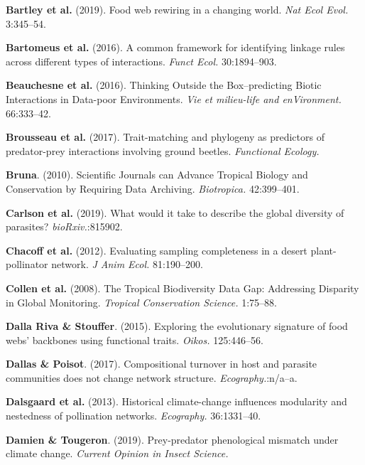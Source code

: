 \leavevmode\hypertarget{ref-BartMcCa19}{}%
\textbf{Bartley et al.} (2019). Food web rewiring in a changing world.
\emph{Nat Ecol Evol.} 3:345--54.

\leavevmode\hypertarget{ref-BartGrav16}{}%
\textbf{Bartomeus et al.} (2016). A common framework for identifying
linkage rules across different types of interactions. \emph{Funct Ecol.}
30:1894--903.

\leavevmode\hypertarget{ref-BeauDesj16}{}%
\textbf{Beauchesne et al.} (2016). Thinking Outside the Box--predicting
Biotic Interactions in Data-poor Environments. \emph{Vie et milieu-life
and enVironment.} 66:333--42.

\leavevmode\hypertarget{ref-BrouGrav17}{}%
\textbf{Brousseau et al.} (2017). Trait-matching and phylogeny as
predictors of predator-prey interactions involving ground beetles.
\emph{Functional Ecology.}

\leavevmode\hypertarget{ref-Brun10}{}%
\textbf{Bruna}. (2010). Scientific Journals can Advance Tropical Biology
and Conservation by Requiring Data Archiving. \emph{Biotropica.}
42:399--401.

\leavevmode\hypertarget{ref-CarlPhil19}{}%
\textbf{Carlson et al.} (2019). What would it take to describe the
global diversity of parasites? \emph{bioRxiv.}:815902.

\leavevmode\hypertarget{ref-ChacVazq12}{}%
\textbf{Chacoff et al.} (2012). Evaluating sampling completeness in a
desert plant-pollinator network. \emph{J Anim Ecol.} 81:190--200.

\leavevmode\hypertarget{ref-CollRam08}{}%
\textbf{Collen et al.} (2008). The Tropical Biodiversity Data Gap:
Addressing Disparity in Global Monitoring. \emph{Tropical Conservation
Science.} 1:75--88.

\leavevmode\hypertarget{ref-DallStou15}{}%
\textbf{Dalla Riva \& Stouffer}. (2015). Exploring the evolutionary
signature of food webs' backbones using functional traits. \emph{Oikos.}
125:446--56.

\leavevmode\hypertarget{ref-DallPois17}{}%
\textbf{Dallas \& Poisot}. (2017). Compositional turnover in host and
parasite communities does not change network structure.
\emph{Ecography.}:n/a--a.

\leavevmode\hypertarget{ref-DalsTroj13}{}%
\textbf{Dalsgaard et al.} (2013). Historical climate-change influences
modularity and nestedness of pollination networks. \emph{Ecography.}
36:1331--40.

\leavevmode\hypertarget{ref-DamiToug19}{}%
\textbf{Damien \& Tougeron}. (2019). Prey-predator phenological mismatch
under climate change. \emph{Current Opinion in Insect Science.}


